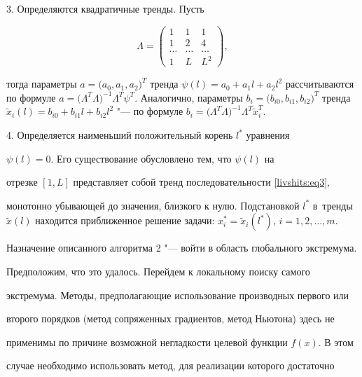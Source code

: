 3. Определяются квадратичные тренды. Пусть

\[

\Lambda =\begin{pmatrix}

 1  & 1  & 1  \\

 1  & 2  & 4  \\

\ldots & \ldots & \ldots \\

 1  & L  & L^2

\end{pmatrix},

\]

тогда параметры $a=\big(a_0,a_1,a_2\big)^T$ тренда $\psi (l)=a_0 +a_1 l+a_2

l^2$ рассчитываются по формуле $a=\big(\Lambda ^T \Lambda \big )^{-1}\Lambda^T \psi

^T$. Аналогично, параметры $b_i =\big( b_{i0}, b_{i1}, b_{i2} \big)^T$ тренда $\tilde

{x}_i (l)=b_{i0} +b_{i1} l+b_{i2} l^2$ "--- по формуле $b_i =\big(\Lambda

^T\Lambda \big)^{-1}\Lambda ^T\tilde {x}_i^T$.



4. Определяется наименьший положительный корень $l^\ast$ уравнения

$\psi (l)=0$. Его существование обусловлено тем, что $\psi (l)$ на

отрезке $[1,L]$ представляет собой тренд последовательности \eqref{livshits:eq3},

монотонно убывающей до значения, близкого к нулю. Подстановкой $l^\ast$ в~тренды $\tilde {x}(l)$ находится приближенное решение задачи: $x_i^\ast

=\tilde {x}_i (l^\ast )$, $i=1,2,\ldots,m$.



Назначение описанного алгоритма 2 "--- войти в область глобального экстремума.

Предположим, что это удалось. Перейдем к локальному поиску самого

экстремума. Методы, предполагающие использование производных первого или

второго порядков (метод сопряженных градиентов, метод Ньютона) здесь не

применимы по причине возможной негладкости целевой функции $f(x)$. В этом

случае необходимо использовать метод, для реализации которого достаточно

